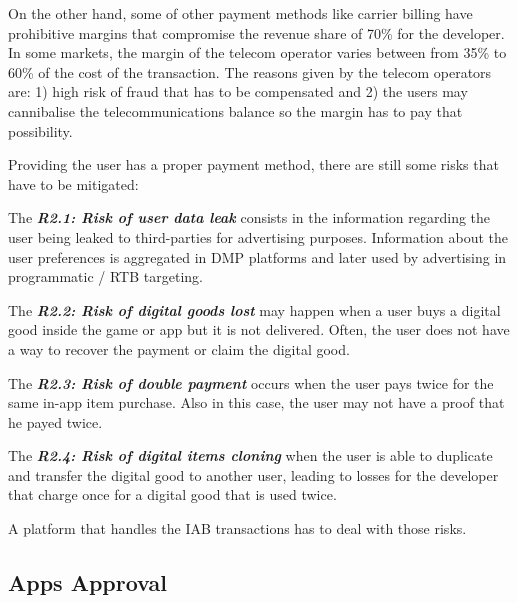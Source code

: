 On the other hand, some of other payment methods like carrier billing have prohibitive margins that compromise the revenue share of 70\% for the developer. In some markets, the margin of the telecom operator varies between from 35\% to 60\% of the cost of the transaction. The reasons given by the telecom operators are: 1) high risk of fraud that has to be compensated and 2) the users may cannibalise the telecommunications balance so the margin has to pay that possibility.


Providing the user has a proper payment method, there are still some risks that have to be mitigated:

\begin{tcolorbox}[enhanced jigsaw,sharp corners, drop fuzzy shadow=ShadowColor]

The {\bf\em R2.1: Risk of user data leak} consists in the information regarding the user being leaked to third-parties for advertising purposes. Information about the user preferences is aggregated in DMP platforms and later used by advertising in programmatic / RTB targeting.


The {\bf\em R2.2: Risk of digital goods lost} may happen when a user buys a digital good inside the game or app but it is not delivered. Often, the user does not have a way to recover the payment or claim the digital good.

The {\bf\em R2.3: Risk of double payment} occurs when the user pays twice for the same in-app item purchase. Also in this case, the user may not have a proof that he payed twice.

The {\bf\em R2.4: Risk of digital items cloning} when the user is able to duplicate and transfer the digital good to another user, leading to losses for the developer that charge once for a digital good that is used twice.

\end{tcolorbox}

A platform that handles the IAB transactions has to deal with those risks.


\subsection{Apps Approval}


